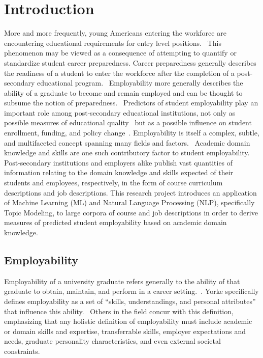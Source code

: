 \section{Introduction}

More and more frequently, young Americans entering the workforce are encountering educational requirements for entry level positions.~\cite{carnevale2010}
This phenomenon may be viewed as a consequence of attempting to quantify or standardize student career preparedness.
Career preparedness generally describes the readiness of a student to enter the workforce after the completion of a post-secondary educational program.~\cite{ccrsOrganizer2014}
Employability more generally describes the ability of a graduate to become and remain employed and can be thought to subsume the notion of preparedness.~\cite{williams2016}
Predictors of student employability play an important role among post-secondary educational institutions, not only as possible measures of educational quality~\cite{storen2010} but as a possible influence on student enrollment, funding, and policy change~\cite{harvey2000}.
Employability is itself a complex, subtle, and multifaceted concept spanning many fields and factors.~\cite{williams2016,yorke2006,harvey2001}
Academic domain knowledge and skills are one such contributory factor to student employability.~\cite{conley2012,ccrsOrganizer2014}
Post-secondary institutions and employers alike publish vast quantities of information relating to the domain knowledge and skills expected of their students and employees, respectively, in the form of course curriculum descriptions and job descriptions.
This research project introduces an application of Machine Learning (ML) and Natural Language Processing (NLP), specifically Topic Modeling, to large corpora of course and job descriptions in order to derive measures of predicted student employability based on academic domain knowledge.

\subsection{Employability}

Employability of a university graduate refers generally to the ability of that graduate to obtain, maintain, and perform in a career setting.~\cite{harvey2001,yorke2006}.
Yorke specifically defines employability as a set of ``skills, understandings, and personal attributes'' that influence this ability.~\cite{yorke2006}
Others in the field concur with this definition, emphasizing that any holistic definition of employability must include academic or domain skills and expertise, transferrable skills, employer expectations and needs, graduate personality characteristics, and even external societal constraints.~\cite{harvey2001,williams2016,thijssen2008,hillage1998}

